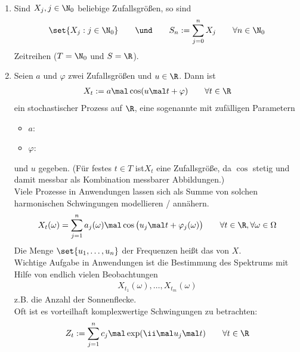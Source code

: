 \begin{beispiel}\label{beisp1.3.3}\
	\begin{enumerate}[label=(\alph*)]
		\item Sind $X_j,j\in\N_0$ beliebige Zufallsgrößen, so sind 
		\begin{align*}
			\set{X_j:j\in\N_0}
			\qquad\und\qquad
			S_n:=\sum\limits_{j=0}^n X_j\qquad\forall n\in\N_0
		\end{align*}
		Zeitreihen ($T=\N_0$ und $S=\R$).
		\item Seien $a$ und $\varphi$ zwei Zufallsgrößen und $u\in\R$.
		Dann ist 
		\begin{align*}
			X_t:=a\mal\cos(u\mal t+\varphi)\qquad\forall t\in\R
		\end{align*}
		ein stochastischer Prozess auf $\R$, eine sogenannte  mit zufälligen Parametern
		\begin{itemize}
			\item $a$: 
			\item $\varphi$: 
		\end{itemize}
		und  $u$ gegeben.
		(Für festes $t\in T$ ist$X_t$ eine Zufallsgröße, da $\cos$ stetig und damit messbar als Kombination messbarer Abbildungen.)\\
		Viele Prozesse in Anwendungen lassen sich als Summe von solchen harmonischen Schwingungen modellieren / annähern.
		\begin{align*}
			X_t(\omega)=\sum\limits_{j=1}^n a_j(\omega)\mal\cos\big(u_j\mal t+\varphi_j(\omega)\big)\qquad\forall t\in\R,\forall\omega\in\Omega
		\end{align*}
		Die Menge $\set{u_1,\ldots,u_n}$ der Frequenzen heißt das  von $X$. \\
		Wichtige Aufgabe in Anwendungen ist die Bestimmung des Spektrums mit Hilfe von endlich vielen Beobachtungen 
		\begin{align*}
			X_{t_1}(\omega),\ldots,X_{t_m}(\omega)
		\end{align*}
		z.B. die Anzahl der Sonnenflecke.\\
		Oft ist es vorteilhaft komplexwertige Schwingungen zu betrachten:
		\begin{align}\label{eq:beispiel1.3.3HarmonischeSchwingungKomplex}
			Z_t:=\sum\limits_{j=1}^n c_j\mal\exp(\ii\mal u_j\mal t)\qquad\forall t\in\R
		\end{align}
	\end{enumerate}
\end{beispiel}




